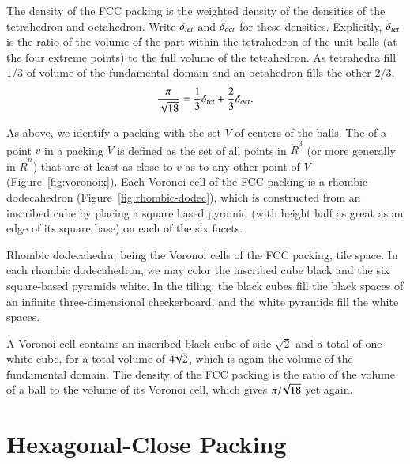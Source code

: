 \figSEYIMIE %

\figAZGXQWC %

The density of the FCC packing is the weighted density
of the densities of the tetrahedron and octahedron.  Write $\delta_{tet}$ and
$\delta_{oct}$ for these densities.  Explicitly, $\delta_{tet}$ is the ratio of the
volume of the part within the tetrahedron of the unit balls (at the
four extreme points) to the full volume of the tetrahedron.  As tetrahedra fill
$1/3$ of volume of the fundamental domain and an octahedron fills
the other $2/3$,
\[ 
  \frac{\pi}{\sqrt{18}} = \frac{1}{3}\delta_{tet} + \frac{2}{3}\delta_{oct}.
\] 

As above, we identify a packing with the set $V$ of centers of the
balls.  The  
of a point $v$ in a packing $V$ is
defined as the set of all points in $\ring{R}^3$ (or more generally in
$\ring{R}^n$) that are at least as close to $v$ as to any other point
of $V$ (Figure~\ref{fig:voronoix}).  Each Voronoi cell of the FCC
packing is a rhombic dodecahedron
(Figure~\ref{fig:rhombic-dodec}),
which is constructed from an inscribed cube by placing a square based pyramid
(with height half as great as an edge of its square base) on each of
the six facets.

%

\figEVIAIQPx %

\figPQJIJGE %

Rhombic dodecahedra, being the Voronoi cells of the FCC packing, tile space.
In each rhombic dodecahedron, we 
may color the inscribed cube black and the six square-based pyramids
white.  In the tiling, 
the black cubes fill the black spaces of an infinite three-dimensional
checkerboard, and the white pyramids fill the white spaces.

A Voronoi cell contains an inscribed black cube of side $\sqrt2$ and a total
of one white cube, for a total volume of $4\!\sqrt2$, which is
again the volume of the fundamental domain.  The density of the
FCC packing is the ratio of the volume of a ball to the volume
of its Voronoi cell, which gives $\pi/\!\sqrt{18}$ yet again.



\section{Hexagonal-Close Packing}\label{sec:hcp}

